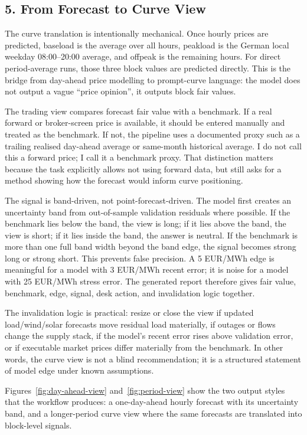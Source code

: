 \documentclass[10pt,a4paper]{article}
\begin{document}
\subsection*{5. From Forecast to Curve View}
The curve translation is intentionally mechanical. Once hourly prices are predicted, baseload is the average over all hours, peakload is the German local weekday 08:00--20:00 average, and offpeak is the remaining hours. For direct period-average runs, those three block values are predicted directly. This is the bridge from day-ahead price modelling to prompt-curve language: the model does not output a vague ``price opinion'', it outputs block fair values.

The trading view compares forecast fair value with a benchmark. If a real forward or broker-screen price is available, it should be entered manually and treated as the benchmark. If not, the pipeline uses a documented proxy such as a trailing realised day-ahead average or same-month historical average. I do not call this a forward price; I call it a benchmark proxy. That distinction matters because the task explicitly allows not using forward data, but still asks for a method showing how the forecast would inform curve positioning.

The signal is band-driven, not point-forecast-driven. The model first creates an uncertainty band from out-of-sample validation residuals where possible. If the benchmark lies below the band, the view is long; if it lies above the band, the view is short; if it lies inside the band, the answer is neutral. If the benchmark is more than one full band width beyond the band edge, the signal becomes strong long or strong short. This prevents false precision. A 5 EUR/MWh edge is meaningful for a model with 3 EUR/MWh recent error; it is noise for a model with 25 EUR/MWh stress error. The generated report therefore gives fair value, benchmark, edge, signal, desk action, and invalidation logic together.

The invalidation logic is practical: resize or close the view if updated load/wind/solar forecasts move residual load materially, if outages or flows change the supply stack, if the model's recent error rises above validation error, or if executable market prices differ materially from the benchmark. In other words, the curve view is not a blind recommendation; it is a structured statement of model edge under known assumptions.

Figures~\ref{fig:day-ahead-view} and~\ref{fig:period-view} show the two output styles that the workflow produces: a one-day-ahead hourly forecast with its uncertainty band, and a longer-period curve view where the same forecasts are translated into block-level signals.
\end{document}
